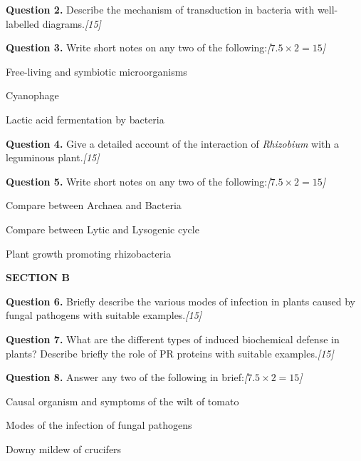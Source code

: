\documentclass[11pt,a4paper]{article}
\newcommand{\pts}[1]{\hfill   \textit{[#1]}}
\begin{document}
\medskip


\noindent   \textbf{Question 2.} Describe the mechanism of transduction in bacteria with well-labelled diagrams.\pts{15}

\medskip


\noindent   \textbf{Question 3.} Write short notes on any two of the following:\pts{$7.5  \times 2 = 15$}

\begin{parts}
  \item Free-living and symbiotic microorganisms
  \item Cyanophage
  \item Lactic acid fermentation by bacteria
\end{parts}

\medskip


\noindent   \textbf{Question 4.} Give a detailed account of the interaction of   \textit{Rhizobium} with a leguminous plant.\pts{15}

\medskip


\noindent   \textbf{Question 5.} Write short notes on any two of the following:\pts{$7.5  \times 2 = 15$}

\begin{parts}
  \item Compare between Archaea and Bacteria
  \item Compare between Lytic and Lysogenic cycle
  \item Plant growth promoting rhizobacteria
\end{parts}

\bigskip

\begin{center}
   \textbf{SECTION B}
\end{center}
\medskip

\medskip


\noindent   \textbf{Question 6.} Briefly describe the various modes of infection in plants caused by fungal pathogens with suitable examples.\pts{15}

\medskip


\noindent   \textbf{Question 7.} What are the different types of induced biochemical defense in plants? Describe briefly the role of PR proteins with suitable examples.\pts{15}

\medskip


\noindent   \textbf{Question 8.} Answer any two of the following in brief:\pts{$7.5  \times 2 = 15$}

\begin{parts}
  \item Causal organism and symptoms of the wilt of tomato
  \item Modes of the infection of fungal pathogens
  \item Downy mildew of crucifers
\end{parts}
\end{document}
